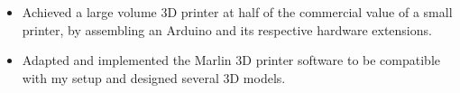 \documentclass[8pt,a4paper]{altacv}
\begin{document}
\begin{itemize}
    \item Achieved a large volume 3D printer at half of the commercial value of a small printer, by assembling an Arduino and its respective hardware extensions.
    \item Adapted and implemented the Marlin 3D printer software to be compatible with my setup and designed several 3D models.
\end{itemize}

\clearpage


\end{document}
